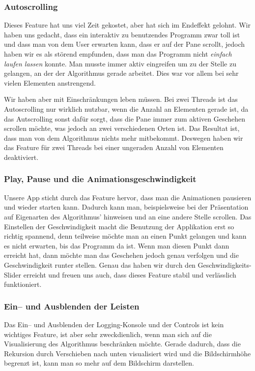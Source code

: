 \subsubsection{Autoscrolling}
Dieses Feature hat uns viel Zeit gekostet, aber hat sich im Endeffekt gelohnt. Wir haben uns gedacht, dass ein interaktiv zu benutzendes Programm zwar toll ist und dass man von dem User erwarten kann, dass er auf der Pane scrollt, jedoch haben wir es als störend empfunden, dass man das Programm nicht \textit{einfach laufen lassen} konnte. Man musste immer aktiv eingreifen um zu der Stelle zu gelangen, an der der Algorithmus gerade arbeitet. Dies war vor allem bei sehr vielen Elementen anstrengend.

Wir haben aber mit Einschränkungen leben müssen. Bei zwei Threads ist das Autoscrolling nur wirklich nutzbar, wenn die Anzahl an Elementen gerade ist, da das Autscrolling sonst dafür sorgt, dass die Pane immer zum aktiven Geschehen scrollen möchte, was jedoch an zwei verschiedenen Orten ist. Das Resultat ist, dass man von dem Algorithmus nichts mehr mitbekommt. Deswegen haben wir das Feature für zwei Threads bei einer ungeraden Anzahl von Elementen deaktiviert.

\subsubsection{Play, Pause und die Animationsgeschwindigkeit}
Unsere App sticht durch das Feature hervor, dass man die Animationen pausieren und wieder starten kann. Dadurch kann man, beispielsweise bei der Präsentation auf Eigenarten des Algorithmus' hinweisen und an eine andere Stelle scrollen. Das Einstellen der Geschwindigkeit macht die Benutzung der Applikation erst so richtig spannend, denn teilweise möchte man an einen Punkt gelangen und kann es nicht erwarten, bis das Programm da ist. Wenn man diesen Punkt dann erreicht hat, dann möchte man das Geschehen jedoch genau verfolgen und die Geschwindigkeit runter stellen. Genau das haben wir durch den Geschwindigkeits-Slider erreicht und freuen uns auch, dass dieses Feature stabil und verlässlich funktioniert.

\subsubsection{Ein-- und Ausblenden der Leisten}
Das Ein-- und Ausblenden der Logging-Konsole und der Controls ist kein wichtiges Feature, ist aber sehr zweckdienlich, wenn man sich auf die Visualisierung des Algorithmus beschränken möchte. Gerade dadurch, dass die Rekursion durch Verschieben nach unten visualisiert wird und die Bildschirmhöhe begrenzt ist, kann man so mehr auf dem Bildschirm darstellen.

